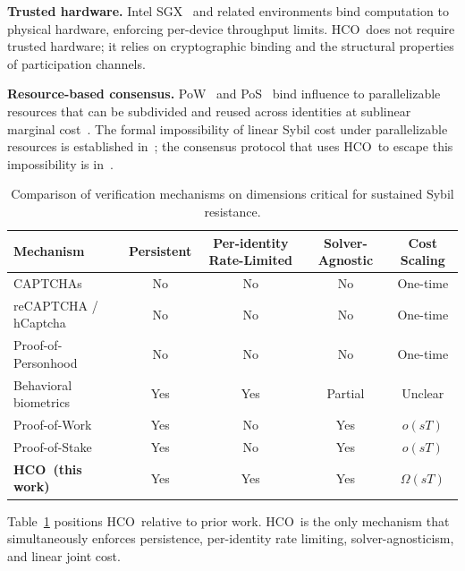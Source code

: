 \documentclass[11pt]{article}
\newcommand{\HCO}{HCO\xspace}
\theoremstyle{remark}
\theoremstyle{plain}
\begin{document}
	\noindent\textbf{Trusted hardware.}
	Intel SGX~\cite{costan2016sgx} and related environments bind computation
	to physical hardware, enforcing per-device throughput limits. \HCO\
	does not require trusted hardware; it relies on cryptographic binding
	and the structural properties of participation channels.
	
	\noindent\textbf{Resource-based consensus.}
	PoW~\cite{nakamoto2008bitcoin} and PoS~\cite{kiayias2017ouroboros} bind
	influence to parallelizable resources that can be subdivided and reused
	across identities at sublinear marginal cost~\cite{bonneau2015sok}.
	The formal impossibility of linear Sybil cost under parallelizable
	resources is established in~\cite{maleki2026geometry}; the consensus
	protocol that uses \HCO\ to escape this impossibility is
	in~\cite{maleki2026pocmt}.
	
	\begin{table}[t]
		\centering
		\caption{Comparison of verification mechanisms on dimensions critical
			for sustained Sybil resistance.}
		\label{tab:hco-taxonomy}
		\begin{tabular}{lcccc}
			\toprule
			Mechanism & Persistent & Per-identity Rate-Limited
			& Solver-Agnostic & Cost Scaling \\
			\midrule
			CAPTCHAs~\cite{vonahn2003captcha}
			& No  & No  & No  & One-time \\
			reCAPTCHA / hCaptcha~\cite{recaptcha2019,hcaptcha2020}
			& No  & No  & No  & One-time \\
			Proof-of-Personhood~\cite{borge2017proofofpersonhood}
			& No  & No  & No  & One-time \\
			Behavioral biometrics~\cite{frank2013touchalytics}
			& Yes & Yes & Partial & Unclear \\
			Proof-of-Work~\cite{nakamoto2008bitcoin}
			& Yes & No  & Yes & $o(sT)$ \\
			Proof-of-Stake~\cite{kiayias2017ouroboros}
			& Yes & No  & Yes & $o(sT)$ \\
			\textbf{\HCO\ (this work)}
			& Yes & Yes & Yes & $\Omega(sT)$ \\
			\bottomrule
		\end{tabular}
	\end{table}
	
	Table~\ref{tab:hco-taxonomy} positions \HCO\ relative to prior work.
	\HCO\ is the only mechanism that simultaneously enforces persistence,
	per-identity rate limiting, solver-agnosticism, and linear joint cost.
	
	
\end{document}
